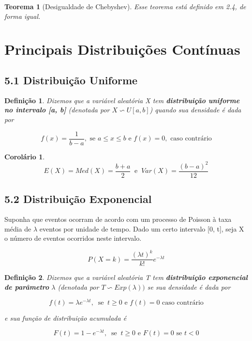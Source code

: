 \documentclass[12pt]{article}
\newtheorem{theorem}{Teorema}[section]
\newtheorem{corollary}{Corolário}[theorem]
\newtheorem{definition}{Definição}
\begin{document}
\begin{theorem}[Desigualdade de Chebyshev]
    Esse teorema está definido em 2.4, de forma igual.
\end{theorem}

\section{Principais Distribuições Contínuas}
\subsection*{5.1 Distribuição Uniforme}
\begin{definition}
    Dizemos que a variável aleatória X tem \textbf{distribuição uniforme no intervalo [a, b]} (denotada por $X \backsim U[a, b]$) quando sua densidade é dada por
    
    $$f(x) = \frac{1}{b - a}, \text{ se } a \leq x \leq b \text{ e } f(x) = 0 ,\text{ caso contrário}$$
\end{definition}

\begin{corollary}
    $$E(X) = Med(X) = \frac{b + a}{2} \ \text{ e } \ Var(X) = \frac{(b - a)^2}{12}$$
\end{corollary}

\subsection*{5.2 Distribuição Exponencial}
Suponha que eventos ocorram de acordo com um processo de Poisson à taxa média de $\lambda$ eventos por unidade de tempo. Dado um certo intervalo [0, t], seja X o número de eventos ocorridos neste intervalo.

$$P(X = k) = \dfrac{(\lambda t)^k}{k!} e^{-\lambda t}$$

\begin{definition}
    Dizemos que a variável aleatória T tem \textbf{distribuição exponencial de parâmetro} $\lambda$ (denotada por $T \backsim Exp(\lambda))$ se sua densidade é dada por
    
    $$f(t) = \lambda e^{- \lambda t}, \ \text{ se } \ t \geq 0 \text{ e } f(t) = 0 \text{ caso contrário}$$
    
    e sua função de distribuição acumulada é
    
    $$F(t) = 1 - e^{- \lambda t}, \ \text{ se } \ t \geq 0 \text{ e } F(t) = 0 \text{ se } t < 0$$
\end{definition}
\end{document}
